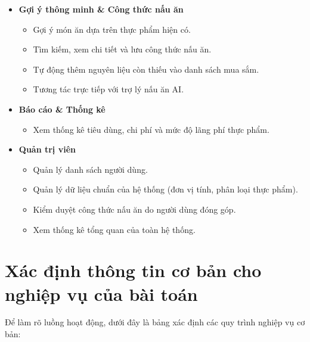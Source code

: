\documentclass[../main.tex]{subfiles}
\begin{document}
\begin{itemize}
\begin{itemize}
    \end{itemize}
    \item \textbf{Gợi ý thông minh \& Công thức nấu ăn}
    \begin{itemize}
        \item Gợi ý món ăn dựa trên thực phẩm hiện có.
        \item Tìm kiếm, xem chi tiết và lưu công thức nấu ăn.
        \item Tự động thêm nguyên liệu còn thiếu vào danh sách mua sắm.
        \item Tương tác trực tiếp với trợ lý nấu ăn AI.
    \end{itemize}
    \item \textbf{Báo cáo \& Thống kê}
    \begin{itemize}
        \item Xem thống kê tiêu dùng, chi phí và mức độ lãng phí thực phẩm.
    \end{itemize}
    \item \textbf{Quản trị viên}
    \begin{itemize}
        \item Quản lý danh sách người dùng.
        \item Quản lý dữ liệu chuẩn của hệ thống (đơn vị tính, phân loại thực phẩm).
        \item Kiểm duyệt công thức nấu ăn do người dùng đóng góp.
        \item Xem thống kê tổng quan của toàn hệ thống.
    \end{itemize}
\end{itemize}

\section{Xác định thông tin cơ bản cho nghiệp vụ của bài toán}

Để làm rõ luồng hoạt động, dưới đây là bảng xác định các quy trình nghiệp vụ cơ bản:
\end{document}
